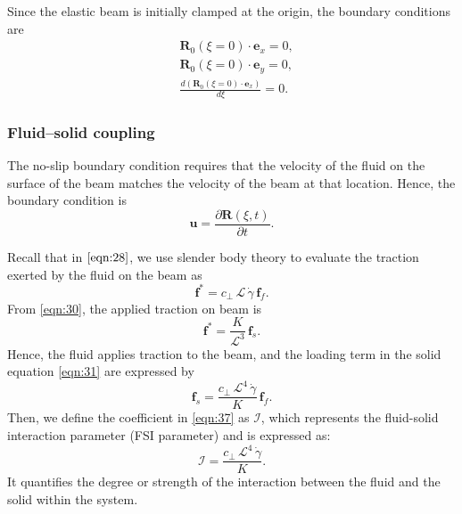 \documentclass[lineno]{JFM-FLM_Au}
\begin{document}
Since the elastic beam is initially clamped at the origin, the boundary conditions are
\begin{equation}
	\label{eqn:58}
	\begin{aligned}
		&\mathbf{R}_0(\xi=0)\cdot\mathbf{e}_x=0,\\
		&\mathbf{R}_0(\xi=0)\cdot\mathbf{e}_y=0,\\
		&\frac{d\left(\mathbf{R}_0(\xi=0)\cdot\mathbf{e}_x\right)}{d\xi}=0.
	\end{aligned}
\end{equation}

\subsubsection{Fluid–solid coupling}
The no-slip boundary condition requires that the velocity of the fluid on the surface of the beam matches the velocity of the beam at that location. Hence, the boundary condition is 
\begin{equation}
	\label{eqn:100}
	\mathbf{u}=\frac{\partial \mathbf{R}(\xi,t)}{\partial t}.
\end{equation}

Recall that in $\eqref{eqn:28}$, we use slender body theory to evaluate the traction exerted by the fluid on the beam as
\begin{equation}
	\label{eqn:102}
	\mathbf{f}^*=c_\perp\,\mathcal{L}\,\dot{\gamma}\,\mathbf{f}_{f}.
\end{equation}
From \eqref{eqn:30}, the applied traction on beam is 
\begin{equation}
	\label{eqn:103}
	\mathbf{f}^*=\frac{K}{\mathcal{L}^3}\,\mathbf{f}_{s}.
\end{equation}
Hence, the fluid applies traction to the beam, and the loading term in the solid equation \eqref{eqn:31} are expressed by
\begin{equation}
	\label{eqn:37}
	\mathbf{f}_{s}=\frac{c_\perp\,\mathcal{L}^4\,\dot{\gamma}}{K}\,\mathbf{f}_{f}.
\end{equation}
Then, we define the coefficient in \eqref{eqn:37} as $\mathcal{I}$, which represents the fluid-solid interaction parameter (FSI parameter) and is expressed as:
\begin{equation}
	\label{eqn:38}
	\mathcal{I}=\frac{c_\perp\,\mathcal{L}^4\,\dot{\gamma}}{K}.
\end{equation}
It quantifies the degree or strength of the interaction between the fluid and the solid within the system.
\end{document}
